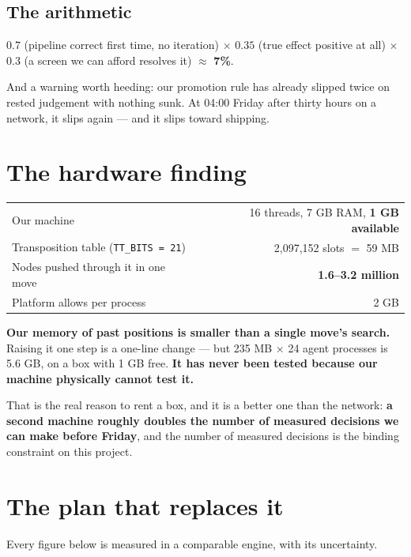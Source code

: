 \documentclass[11pt,a4paper]{article}
\newcommand{\bad}[1]{\textcolor{red!65!black}{\textbf{#1}}}
\begin{document}
\subsection{The arithmetic}

$0.7$ (pipeline correct first time, no iteration) $\times$ $0.35$ (true effect positive at all)
$\times$ $0.3$ (a screen we can afford resolves it) $\approx$ \bad{7\%}.

And a warning worth heeding: our promotion rule has already slipped twice on rested judgement
with nothing sunk. At 04:00 Friday after thirty hours on a network, it slips again --- and it
slips toward shipping.

\section{The hardware finding}

\begin{center}
\begin{tabular}{lr}
\toprule
Our machine & 16 threads, 7 GB RAM, \bad{1 GB available} \\
Transposition table (\texttt{TT\_BITS = 21}) & 2{,}097{,}152 slots $=$ 59 MB \\
Nodes pushed through it in one move & \bad{1.6--3.2 million} \\
Platform allows per process & 2 GB \\
\bottomrule
\end{tabular}
\end{center}

\textbf{Our memory of past positions is smaller than a single move's search.} Raising it one step
is a one-line change --- but 235 MB $\times$ 24 agent processes is 5.6 GB, on a box with 1 GB
free. \textbf{It has never been tested because our machine physically cannot test it.}

That is the real reason to rent a box, and it is a better one than the network: \textbf{a second
machine roughly doubles the number of measured decisions we can make before Friday}, and the
number of measured decisions is the binding constraint on this project.

\section{The plan that replaces it}

Every figure below is measured in a comparable engine, with its uncertainty.
\end{document}
